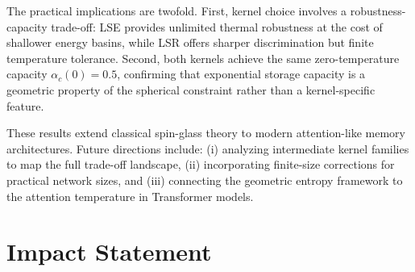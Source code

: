 \documentclass{article}
\theoremstyle{plain}
\theoremstyle{definition}
\theoremstyle{remark}
\begin{document}
The practical implications are twofold. First, kernel choice involves a robustness-capacity trade-off: LSE provides unlimited thermal robustness at the cost of shallower energy basins, while LSR offers sharper discrimination but finite temperature tolerance. Second, both kernels achieve the same zero-temperature capacity $\alpha_c(0) = 0.5$, confirming that exponential storage capacity is a geometric property of the spherical constraint rather than a kernel-specific feature.

These results extend classical spin-glass theory to modern attention-like memory architectures. Future directions include: (i) analyzing intermediate kernel families to map the full trade-off landscape, (ii) incorporating finite-size corrections for practical network sizes, and (iii) connecting the geometric entropy framework to the attention temperature in Transformer models.












\section*{Impact Statement}
\end{document}
